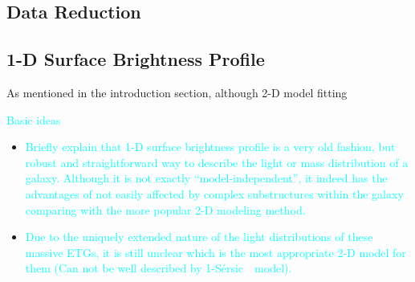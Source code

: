 \documentclass[preprint]{aastex}
\def\ser{{S\'{e}rsic\ }}
\newcommand{\plan}[1]{\textcolor{cyan}{#1}}
\begin{document}
\begin{CJK*}{UTF8}{gbsn}
\section{Data Reduction}

\subsection{1-D Surface Brightness Profile}

    As mentioned in the introduction section, although 2-D model fitting 
    
    \plan{Basic ideas}
    \begin{itemize}
        \item \plan{Briefly explain that 1-D surface brightness profile is a very old 
            fashion, but robust and straightforward way to describe the light or mass 
            distribution of a galaxy.  Although it is not exactly ``model-independent'', 
            it indeed has the advantages of not easily affected by complex substructures 
            within the galaxy comparing with the more popular 2-D modeling method. }
        \item \plan{Due to the uniquely extended nature of the light distributions of 
            these massive ETGs, it is still unclear which is the most appropriate 2-D 
            model for them (Can not be well described by 1-\ser~model). }
    \end{itemize}
    

\end{CJK*}
\end{document}
